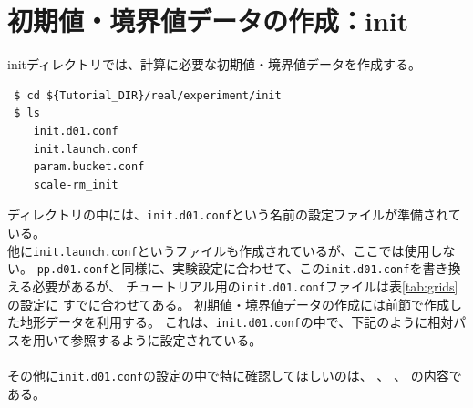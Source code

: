 \section{初期値・境界値データの作成：init} \label{sec:tutrial_real_init}

initディレクトリでは、\scalerm 計算に必要な初期値・境界値データを作成する。
\begin{verbatim}
 $ cd ${Tutorial_DIR}/real/experiment/init
 $ ls
    init.d01.conf
    init.launch.conf
    param.bucket.conf
    scale-rm_init
\end{verbatim}
ディレクトリの中には、\verb|init.d01.conf|という名前の設定ファイルが準備されている。\\
他に\verb|init.launch.conf|というファイルも作成されているが、ここでは使用しない。
\verb|pp.d01.conf|と同様に、実験設定に合わせて、この\verb|init.d01.conf|を書き換える必要があるが、
チュートリアル用の\verb|init.d01.conf|ファイルは表\ref{tab:grids}の設定に
すでに合わせてある。
初期値・境界値データの作成には前節で作成した地形データを利用する。
これは、\verb|init.d01.conf|の中で、下記のように相対パスを用いて参照するように設定されている。\\

\\

\noindent その他に\verb|init.d01.conf|の設定の中で特に確認してほしいのは、
、
、
の内容である。\\

